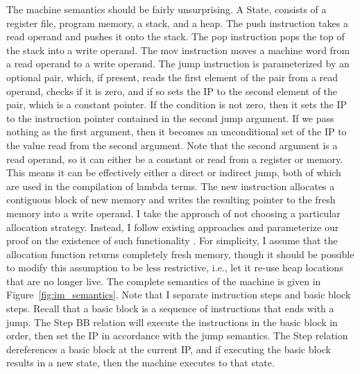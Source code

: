 The machine semantics should be fairly unsurprising. A State, consists of a
register file, program memory, a stack, and a heap. The push instruction takes a
read operand and pushes it onto the stack. The pop instruction pops the
top of the stack into a write operand. The mov instruction moves a machine word
from a read operand to a write operand. The jump instruction is parameterized by
an optional pair, which, if present, reads the first element of the pair from a
read operand, checks if it is zero, and if so sets the IP to the second element
of the pair, which is a constant pointer. If the condition is not zero, then it
sets the IP to the instruction pointer contained in the second jump argument. If
we pass nothing as the first argument, then it becomes an unconditional set of
the IP to the value read from the second argument.  Note that the second
argument is a read operand, so it can either be a constant or read from a register
or memory. This means it can be effectively either a direct or indirect jump,
both of which are used in the compilation of lambda terms. The new instruction
allocates a contiguous block of new memory and writes the resulting pointer to
the fresh memory into a write operand. I take the approach of not choosing a
particular allocation strategy. Instead, I follow existing approaches and
parameterize our proof on the existence of such functionality
\cite{chlipala2007certified}. For simplicity, I assume that the allocation
function returns completely fresh memory, though it should be possible to modify
this assumption to be less restrictive, i.e., let it re-use heap locations that
are no longer live. The complete semantics of the machine is given in
Figure~\ref{fig:im_semantics}.  Note that I separate instruction steps and
basic block steps. Recall that a basic block is a sequence of instructions that
ends with a jump. The Step BB relation will execute the instructions
in the basic block in order, then set the IP in accordance with the
jump semantics. The Step relation dereferences a basic block at the current IP,
and if executing the basic block results in a new state, then the machine
executes to that state. 

